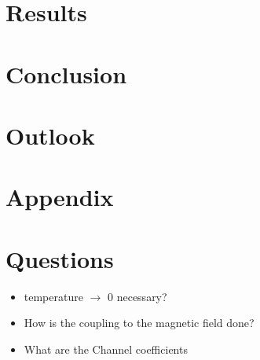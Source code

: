 \section{Results}
\section{Conclusion}
\section{Outlook}
\section{Appendix}


\section{Questions}
\begin{itemize}
  \item temperature $\rightarrow$ 0 necessary?
  \item How is the coupling to the magnetic field done?
  \item What are the Channel coefficients \cite{PhysRevB.31.6207}
\end{itemize}

\clearpage




